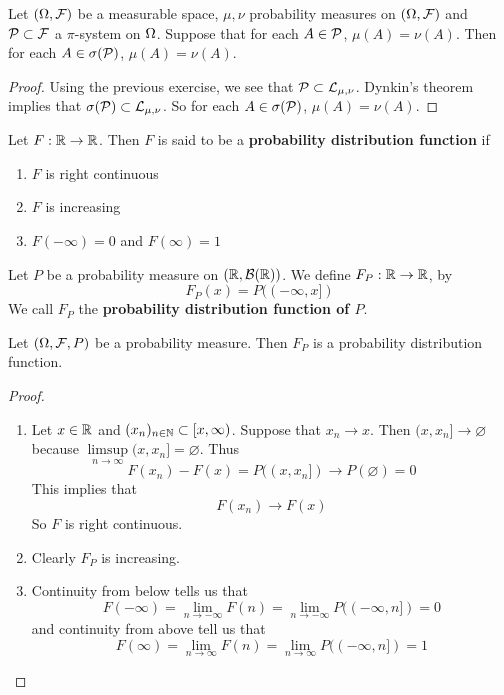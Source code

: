 \documentclass{book}
\begin{document}
	\begin{ex}
		Let $(\Omega, \mathcal{F})$ be a measurable space, $\mu, \nu$ probability measures on $(\Omega, \mathcal{F})$ and $\mathcal{P} \subset \mathcal{F}$ a $\pi$-system on $\Omega$. Suppose that for each $A \in \mathcal{P}$, $\mu(A) = \nu(A)$. Then for each $A \in \sigma(\mathcal{P})$, $\mu(A) = \nu(A)$.
	\end{ex}
	
	\begin{proof}
		Using the previous exercise, we see that $\mathcal{P} \subset \mathcal{L}_{\mu, \nu}$. Dynkin's theorem implies that $\sigma(\mathcal{P}) \subset \mathcal{L}_{\mu, \nu}$. So for each $A \in \sigma(\mathcal{P})$, $\mu(A) = \nu(A)$.
	\end{proof}
	
	
	
	
	
	
	
	
	\begin{defn}
		Let $F: \mathbb{R} \rightarrow \mathbb{R}$. Then $F$ is said to be a \textbf{probability distribution function} if 
		\begin{enumerate}
			\item $F$ is right continuous
			\item $F$ is increasing
			\item $F(-\infty)  = 0$ and $F(\infty)  = 1$
		\end{enumerate}
	\end{defn}
	
	\begin{defn}
		Let $P $ be a probability measure on $(\mathbb{R}, \mathcal{B}(\mathbb{R}))$. We define $F_P: \mathbb{R} \rightarrow \mathbb{R}$, by $$F_P(x) = P((-\infty, x])$$ We call $F_P$ the \textbf{probability distribution function of $P$}.
	\end{defn}
	
	\begin{ex}
		Let $(\Omega, \mathcal{F}, P)$ be a probability measure. Then $F_P$ is a probability distribution function.
	\end{ex}
	
	\begin{proof}
		\begin{enumerate}
			\item Let $x \in \mathbb{R}$ and $(x_n)_{n \in \mathbb{N}} \subset [x, \infty)$. Suppose that $x_n \rightarrow x$. Then $(x, x_n] \rightarrow \varnothing$ because $\limsup\limits_{n \rightarrow \infty} (x,x_n] = \varnothing$. Thus $$F(x_n) - F(x) = P((x, x_n]) \rightarrow P(\varnothing) = 0$$This implies that $$F(x_n) \rightarrow F(x)$$ So $F$ is right continuous.
			\item Clearly $F_P$ is increasing.
			\item Continuity from below tells us that $$F(-\infty) = \lim_{n \rightarrow -\infty}F(n) = \lim_{n \rightarrow -\infty}P((-\infty,n]) = 0$$ and continuity from above tell us that $$F(\infty)  = \lim_{n \rightarrow \infty}F(n) = \lim_{n \rightarrow \infty}P((-\infty, n]) = 1$$ 
		\end{enumerate}
	\end{proof}
	
\end{document}
